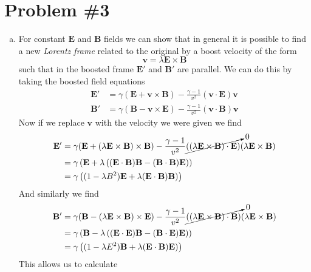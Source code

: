 \documentclass[11pt]{article}
\numberwithin{equation}{section}
\begin{document}
\section{Problem \#3}
\begin{enumerate}[(a)]
\item
    For constant $\mathbf{E}$ and $\mathbf{B}$ fields we can show that in general it is possible to find a new
    \emph{Lorentz frame} related to the original by a boost velocity of the form
    $$\mathbf{v} = \lambda\mathbf{E}\times\mathbf{B}$$
    such that in the boosted frame $\mathbf{E}'$ and $\mathbf{B}'$ are parallel. We can do this by taking the boosted
    field equations 
    \begin{align*}
        \mathbf{E}' &= \gamma(\mathbf{E}+\mathbf{v}\times\mathbf{B}) - \frac{\gamma-1}{v^2}(\mathbf{v}\cdot\mathbf{E})\mathbf{v}\\
        \mathbf{B}' &= \gamma(\mathbf{B}-\mathbf{v}\times\mathbf{E}) - \frac{\gamma-1}{v^2}(\mathbf{v}\cdot\mathbf{B})\mathbf{v}
    \end{align*}
    Now if we replace $\mathbf{v}$ with the velocity we were given we find
    \begin{align*}
        \mathbf{E}' &= \gamma(\mathbf{E}+(\lambda\mathbf{E}\times\mathbf{B})\times\mathbf{B}) - \frac{\gamma-1}{v^2}\cancelto{0}{((\lambda\mathbf{E}\times\mathbf{B})\cdot\mathbf{E})}(\lambda\mathbf{E}\times\mathbf{B})\\
                    &= \gamma\left(\mathbf{E} + \lambda\left((\mathbf{E}\cdot\mathbf{B})\mathbf{B}-(\mathbf{B}\cdot\mathbf{B})\mathbf{E}\right)\right)\\
                    &= \gamma\left((1-\lambda{B^2})\mathbf{E} + \lambda(\mathbf{E}\cdot\mathbf{B})\mathbf{B})\right)
    \end{align*}
    And similarly we find
    \begin{align*}
        \mathbf{B}' &= \gamma(\mathbf{B}-(\lambda\mathbf{E}\times\mathbf{B})\times\mathbf{E}) - \frac{\gamma-1}{v^2}\cancelto{0}{((\lambda\mathbf{E}\times\mathbf{B})\cdot\mathbf{B})}(\lambda\mathbf{E}\times\mathbf{B})\\
                    &= \gamma\left(\mathbf{B} - \lambda\left((\mathbf{E}\cdot\mathbf{E})\mathbf{B}-(\mathbf{B}\cdot\mathbf{E})\mathbf{E}\right)\right)\\
                    &= \gamma\left((1-\lambda{E^2})\mathbf{B} + \lambda(\mathbf{E}\cdot\mathbf{B})\mathbf{E})\right)
    \end{align*}
    This allows us to calculate
    \begin{align*}

\end{align*}
\end{enumerate}
\end{document}
